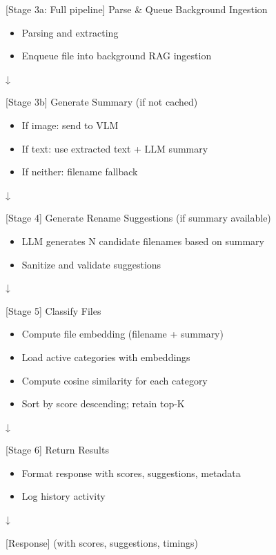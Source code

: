 \documentclass[12pt,oneside,openright,a4paper]{cpe-english-project}
\begin{document}
[Stage 3a: Full pipeline] Parse \& Queue Background Ingestion

\begin{itemize}
\item Parsing and extracting
\item Enqueue file into background RAG ingestion
\end{itemize}
\noindent\hspace*{0.6in}↓

[Stage 3b] Generate Summary (if not cached)

\begin{itemize}
\item If image: send to VLM
\item If text: use extracted text + LLM summary
\item If neither: filename fallback
\end{itemize}
\noindent\hspace*{0.6in}↓

[Stage 4] Generate Rename Suggestions (if summary available)

\begin{itemize}
\item LLM generates N candidate filenames based on summary
\item Sanitize and validate suggestions
\end{itemize}
\noindent\hspace*{0.6in}↓

[Stage 5] Classify Files

\begin{itemize}
\item Compute file embedding (filename + summary)
\item Load active categories with embeddings
\item Compute cosine similarity for each category
\item Sort by score descending; retain top-K
\end{itemize}
\noindent\hspace*{0.6in}↓

[Stage 6] Return Results

\begin{itemize}
\item Format response with scores, suggestions, metadata
\item Log history activity
\end{itemize}
\noindent\hspace*{0.6in}↓

[Response] (with scores, suggestions, timings)
\end{document}
